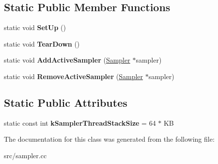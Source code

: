 \subsection*{Static Public Member Functions}
\begin{DoxyCompactItemize}
\item 
\hypertarget{classv8_1_1internal_1_1_sampler_thread_a165be0ab4e47a58417fd0cd14a564cc9}{}static void {\bfseries Set\+Up} ()\label{classv8_1_1internal_1_1_sampler_thread_a165be0ab4e47a58417fd0cd14a564cc9}

\item 
\hypertarget{classv8_1_1internal_1_1_sampler_thread_af5b3127fbcd9d62dc1050470cd62b8dc}{}static void {\bfseries Tear\+Down} ()\label{classv8_1_1internal_1_1_sampler_thread_af5b3127fbcd9d62dc1050470cd62b8dc}

\item 
\hypertarget{classv8_1_1internal_1_1_sampler_thread_a2940cf2fca12b63d25de4b4b815fa8cd}{}static void {\bfseries Add\+Active\+Sampler} (\hyperlink{classv8_1_1internal_1_1_sampler}{Sampler} $\ast$sampler)\label{classv8_1_1internal_1_1_sampler_thread_a2940cf2fca12b63d25de4b4b815fa8cd}

\item 
\hypertarget{classv8_1_1internal_1_1_sampler_thread_a3285276f1ba701dc497ca078f53e545d}{}static void {\bfseries Remove\+Active\+Sampler} (\hyperlink{classv8_1_1internal_1_1_sampler}{Sampler} $\ast$sampler)\label{classv8_1_1internal_1_1_sampler_thread_a3285276f1ba701dc497ca078f53e545d}

\end{DoxyCompactItemize}
\subsection*{Static Public Attributes}
\begin{DoxyCompactItemize}
\item 
\hypertarget{classv8_1_1internal_1_1_sampler_thread_afd75dabf3f8f54bf2b9cf934a16b19b2}{}static const int {\bfseries k\+Sampler\+Thread\+Stack\+Size} = 64 $\ast$ K\+B\label{classv8_1_1internal_1_1_sampler_thread_afd75dabf3f8f54bf2b9cf934a16b19b2}

\end{DoxyCompactItemize}


The documentation for this class was generated from the following file\+:\begin{DoxyCompactItemize}
\item 
src/sampler.\+cc\end{DoxyCompactItemize}
